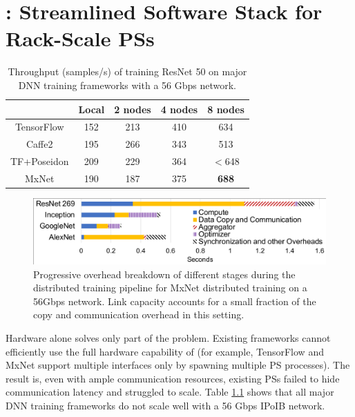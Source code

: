 \chapter{\phub: Streamlined Software Stack for Rack-Scale PSs}

\begin{table}[tb!]
        \centering
        \footnotesize
	\begin{tabular}{|c|c|c|c|c|}
		\hline
		   & Local & 2 nodes & 4 nodes & 8 nodes\\
		\hline 
		TensorFlow   & 152  &  213  & 410    &  634 \\
		\hline
		Caffe2 & 195   &  266  &  343   &   513  \\
		\hline
		TF+Poseidon\cite{poseidon} & 209 & 229  & 364 & $<$648 \\
		\hline
		MxNet & 190  &  187  &  375   &  \textbf{688}  \\
		\hline
	\end{tabular}
	\caption{Throughput (samples/s) of training ResNet 50 on  major DNN training frameworks with a 56 Gbps network.}
	\label{table:frameworkPerf}
\end{table}

\begin{figure}
    \centering
	\includegraphics[width=.7\linewidth,trim=3 2 2 4,clip]{Figures/OverheadBreakdown.pdf}
	\caption{Progressive overhead breakdown of different stages during the distributed training pipeline for MxNet distributed training on a 56Gbps network. Link capacity accounts for a small fraction of the copy and communication overhead in this setting.}
	\label{fig:overheadBreakdown}
\end{figure}

Hardware alone solves only part of the problem. Existing frameworks cannot efficiently use the full hardware capability of \pbox (for example, TensorFlow and MxNet support multiple interfaces only by spawning multiple PS processes). The result is, even with ample communication resources, existing PSs failed to hide communication latency and struggled to scale. Table \ref{table:frameworkPerf} shows that all major DNN training frameworks %
do not scale well with a 56 Gbps IPoIB network.

